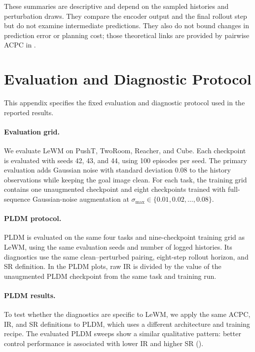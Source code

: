 \documentclass{article}
\newcommand{\stdmax}{\ensuremath{\sigma_{\max}}}
\begin{document}
These summaries are descriptive and depend on the sampled histories and
perturbation draws. They compare the encoder output and the final rollout step
but do not examine intermediate predictions. They also do not bound changes
in prediction error or planning cost; those theoretical links are provided by
pairwise ACPC in .

\section{Evaluation and Diagnostic Protocol}\label{sec:appendix-A}

This appendix specifies the fixed evaluation and diagnostic protocol used in
the reported results.

\paragraph{Evaluation grid.}
We evaluate LeWM on PushT, TwoRoom, Reacher, and Cube. Each checkpoint is
evaluated with seeds 42, 43, and 44, using 100 episodes per seed. The primary
evaluation adds Gaussian noise with standard deviation $0.08$ to the history
observations while keeping the goal image clean. For each task, the training
grid contains one unaugmented checkpoint and eight checkpoints trained with
full-sequence Gaussian-noise augmentation at
$\stdmax{}\in\{0.01,0.02,\ldots,0.08\}$.

\paragraph{PLDM protocol.}
PLDM is evaluated on the same four tasks and nine-checkpoint training grid as
LeWM, using the same evaluation seeds and number of logged histories. Its
diagnostics use the same clean--perturbed pairing, eight-step rollout horizon,
and SR definition. In the PLDM plots, raw IR is divided by the value of the
unaugmented PLDM checkpoint from the same task and training run.

\paragraph{PLDM results.}\label{sec:exp-pldm-diagnostics}
To test whether the diagnostics are specific to LeWM, we apply the same ACPC,
IR, and SR definitions to PLDM, which uses a different architecture and
training recipe. The evaluated PLDM sweeps show a similar qualitative pattern:
better control performance is associated with lower IR and higher SR
().
\end{document}
